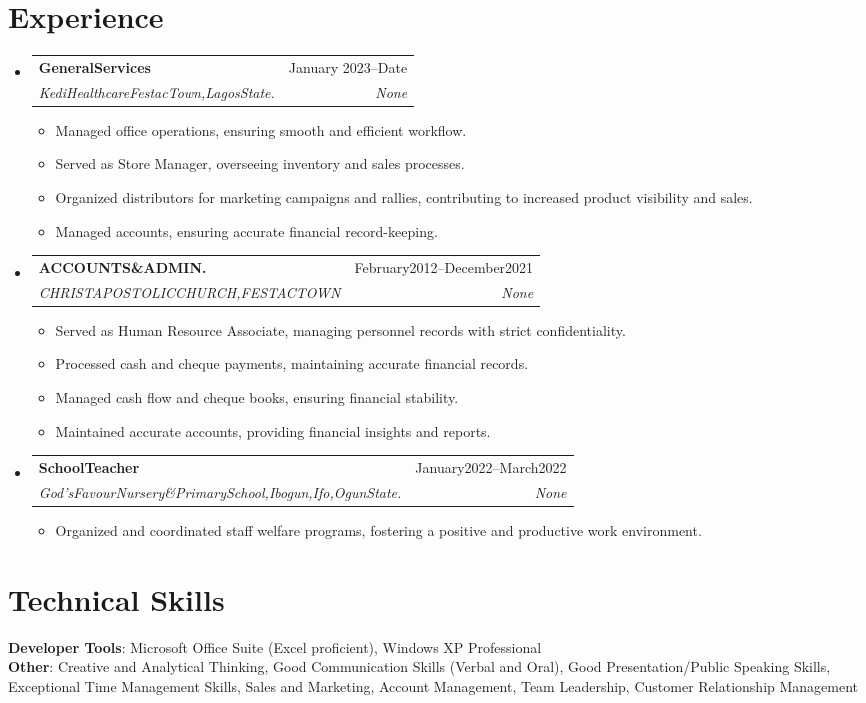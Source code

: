 \documentclass[letterpaper,11pt]{article}
\makeatletter
\newcommand{\resumeItem}[1]{
  \item\small{
    {#1 \vspace{-2pt}}
  }
}
\newcommand{\resumeSubheading}[4]{
  \vspace{-2pt}\item
    \begin{tabular*}{0.97\textwidth}[t]{l@{\extracolsep{\fill}}r}
      \textbf{#1} & #2 \\
      \textit{\small#3} & \textit{\small #4} \\
    \end{tabular*}\vspace{-7pt}
}
\newcommand{\resumeSubHeadingListStart}{\begin{itemize}[leftmargin=0.15in, label={}]}
\newcommand{\resumeSubHeadingListEnd}{\end{itemize}}
\newcommand{\resumeItemListStart}{\begin{itemize}}
\newcommand{\resumeItemListEnd}{\end{itemize}\vspace{-5pt}}
\makeatother
\begin{document}
\section{Experience}
  \resumeSubHeadingListStart
    \resumeSubheading
      {GeneralServices}{January 2023--Date}
      {KediHealthcareFestacTown,LagosState.}{None}
      \resumeItemListStart
        \resumeItem{Managed office operations, ensuring smooth and efficient workflow.}
        \resumeItem{Served as Store Manager, overseeing inventory and sales processes.}
        \resumeItem{Organized distributors for marketing campaigns and rallies, contributing to increased product visibility and sales.}
        \resumeItem{Managed accounts, ensuring accurate financial record-keeping.}
      \resumeItemListEnd
    \resumeSubheading
      {ACCOUNTS\&ADMIN.}{February2012--December2021}
      {CHRISTAPOSTOLICCHURCH,FESTACTOWN}{None}
      \resumeItemListStart
        \resumeItem{Served as Human Resource Associate, managing personnel records with strict confidentiality.}
        \resumeItem{Processed cash and cheque payments, maintaining accurate financial records.}
        \resumeItem{Managed cash flow and cheque books, ensuring financial stability.}
        \resumeItem{Maintained accurate accounts, providing financial insights and reports.}
      \resumeItemListEnd
    \resumeSubheading
      {SchoolTeacher}{January2022--March2022}
      {God’sFavourNursery\&PrimarySchool,Ibogun,Ifo,OgunState.}{None}
      \resumeItemListStart
        \resumeItem{Organized and coordinated staff welfare programs, fostering a positive and productive work environment.}
      \resumeItemListEnd
  \resumeSubHeadingListEnd

\section{Technical Skills}
 \begin{itemize}[leftmargin=0.15in, label={}]
    \small{\item{
     \textbf{Developer Tools}: Microsoft Office Suite (Excel proficient), Windows XP Professional \\
     \textbf{Other}: Creative and Analytical Thinking, Good Communication Skills (Verbal and Oral), Good Presentation/Public Speaking Skills, Exceptional Time Management Skills, Sales and Marketing, Account Management, Team Leadership, Customer Relationship Management
    }}
 \end{itemize}

\end{document}
